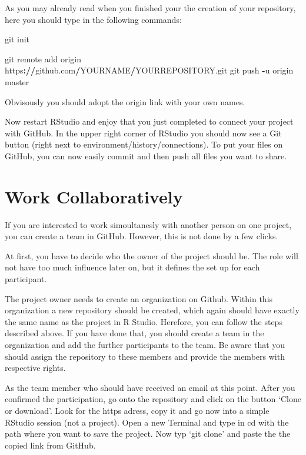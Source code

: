 \documentclass[]{report}
\newenvironment{Shaded}{\begin{snugshade}}{\end{snugshade}}
\newcommand{\OperatorTok}[1]{\textcolor[rgb]{0.81,0.36,0.00}{\textbf{#1}}}
\newcommand{\ErrorTok}[1]{\textcolor[rgb]{0.64,0.00,0.00}{\textbf{#1}}}
\newcommand{\NormalTok}[1]{#1}
\begin{document}
As you may already read when you finished your the creation of your
repository, here you should type in the following commands:

\begin{Shaded}
\begin{Highlighting}[]
\NormalTok{git init}


\NormalTok{git remote add origin https}\OperatorTok{:}\ErrorTok{//}\NormalTok{github.com}\OperatorTok{/}\NormalTok{YOURNAME}\OperatorTok{/}\NormalTok{YOURREPOSITORY.git}
\NormalTok{git push }\OperatorTok{-}\NormalTok{u origin master}
\end{Highlighting}
\end{Shaded}

Obvisously you should adopt the origin link with your own names.

Now restart RStudio and enjoy that you just completed to connect your
project with GitHub. In the upper right corner of RStudio you should now
see a Git button (right next to environment/history/connections). To put
your files on GitHub, you can now easily commit and then push all files
you want to share.

\section{Work Collaboratively}\label{work-collaboratively}

If you are interested to work simoultanesly with another person on one
project, you can create a team in GitHub. However, this is not done by a
few clicks.

At first, you have to decide who the owner of the project should be. The
role will not have too much influence later on, but it defines the set
up for each participant.

The project owner needs to create an organization on Github. Within this
organization a new repository should be created, which again should have
exactly the same name as the project in R Studio. Herefore, you can
follow the steps described above. If you have done that, you should
create a team in the organization and add the further participants to
the team. Be aware that you should assign the repository to these
members and provide the members with respective rights.

As the team member who should have received an email at this point.
After you confirmed the participation, go onto the repository and click
on the button `Clone or download'. Look for the https adress, copy it
and go now into a simple RStudio session (not a project). Open a new
Terminal and type in cd with the path where you want to save the
project. Now typ `git clone' and paste the the copied link from GitHub.
\end{document}
